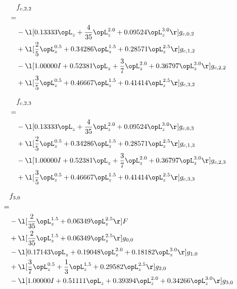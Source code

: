 \begin{alignat}{2} 
\label{eq:f_22_0} 
& f_{c,2,2} \nonumber \\ 
 = \\ 
& - \l[  0.13333 \opL_z + \frac{4}{35} \opL_z^{2.0} +  0.09524 \opL_z^{3.0}  \r] g_{c,0,2} \nonumber \\ 
& + \l[ \frac{2}{5} \opL_z^{0.5} +  0.34286 \opL_z^{1.5} +  0.28571 \opL_z^{2.5}  \r] g_{c,1,2} \nonumber \\ 
& - \l[  1.00000 I +  0.52381 \opL_z + \frac{3}{7} \opL_z^{2.0} +  0.36797 \opL_z^{3.0}  \r] g_{c,2,2} \nonumber \\ 
& + \l[ \frac{3}{5} \opL_z^{0.5} +  0.46667 \opL_z^{1.5} +  0.41414 \opL_z^{2.5}  \r] g_{c,3,2} \nonumber \\ 
\end{alignat} 


\begin{alignat}{2} 
\label{eq:f_23_0} 
& f_{c,2,3} \nonumber \\ 
 = \\ 
& - \l[  0.13333 \opL_z + \frac{4}{35} \opL_z^{2.0} +  0.09524 \opL_z^{3.0}  \r] g_{c,0,3} \nonumber \\ 
& + \l[ \frac{2}{5} \opL_z^{0.5} +  0.34286 \opL_z^{1.5} +  0.28571 \opL_z^{2.5}  \r] g_{c,1,3} \nonumber \\ 
& - \l[  1.00000 I +  0.52381 \opL_z + \frac{3}{7} \opL_z^{2.0} +  0.36797 \opL_z^{3.0}  \r] g_{c,2,3} \nonumber \\ 
& + \l[ \frac{3}{5} \opL_z^{0.5} +  0.46667 \opL_z^{1.5} +  0.41414 \opL_z^{2.5}  \r] g_{c,3,3} \nonumber \\ 
\end{alignat} 


\begin{alignat}{2} 
\label{eq:f_30_0} 
& f_{3,0} \nonumber \\ 
 = \\ 
& - \l[ \frac{2}{35} \opL_z^{1.5} +  0.06349 \opL_z^{2.5}  \r] F \nonumber \\ 
& + \l[ \frac{2}{35} \opL_z^{1.5} +  0.06349 \opL_z^{2.5}  \r] g_{0,0} \nonumber \\ 
& - \l[  0.17143 \opL_z +  0.19048 \opL_z^{2.0} +  0.18182 \opL_z^{3.0}  \r] g_{1,0} \nonumber \\ 
& + \l[ \frac{3}{7} \opL_z^{0.5} + \frac{1}{3} \opL_z^{1.5} +  0.29582 \opL_z^{2.5}  \r] g_{2,0} \nonumber \\ 
& - \l[  1.00000 I +  0.51111 \opL_z +  0.39394 \opL_z^{2.0} +  0.34266 \opL_z^{3.0}  \r] g_{3,0} \nonumber \\ 
\end{alignat} 


